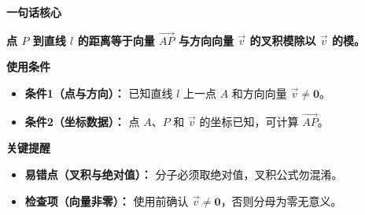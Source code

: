 \begin{summarybox}
	\textbf{\textcolor{CSummary}{一句话核心}}

	\textbf{点 $P$ 到直线 $l$ 的距离等于向量 $\vec{AP}$ 与方向向量 $\vec{v}$ 的叉积模除以 $\vec{v}$ 的模。}

	\medskip
	\textbf{\textcolor{CSummary}{使用条件}}
	\begin{itemize}[leftmargin=*, itemsep=0.5em, topsep=0.4em]
		\item \textbf{条件1（点与方向）：} 已知直线 $l$ 上一点 $A$ 和方向向量 $\vec{v}\neq\mathbf{0}$。
		\item \textbf{条件2（坐标数据）：} 点 $A$、$P$ 和 $\vec{v}$ 的坐标已知，可计算 $\vec{AP}$。
	\end{itemize}

	\medskip
	\textbf{\textcolor{CSummary}{关键提醒}}
	\begin{itemize}[leftmargin=*, itemsep=0.5em, topsep=0.4em]
		\item \textbf{易错点（叉积与绝对值）：} 分子必须取绝对值，叉积公式勿混淆。
		\item \textbf{检查项（向量非零）：} 使用前确认 $\vec{v}\neq\mathbf{0}$，否则分母为零无意义。
	\end{itemize}
\end{summarybox}
